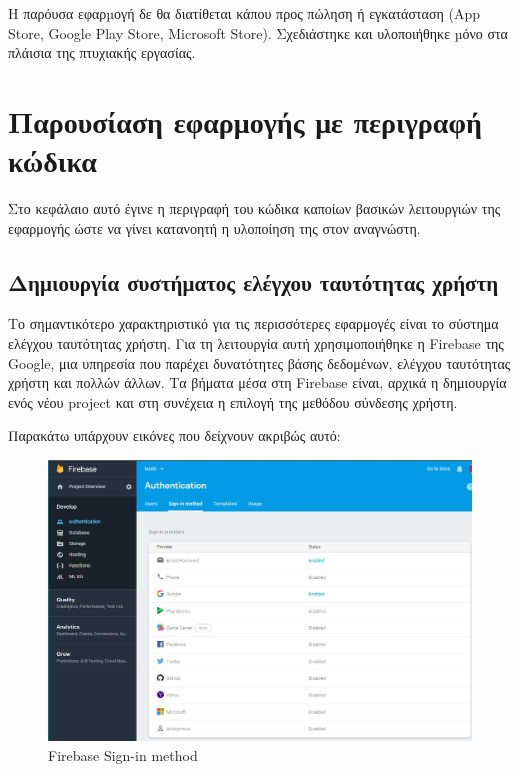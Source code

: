 \documentclass[a4paper,12pt]{article}
\begin{document}
		Η παρόυσα εφαρµογή δε θα διατίθεται κάπου προς πώληση ή εγκατάσταση (App Store, Google Play Store, Microsoft Store).
		Σχεδιάστηκε και υλοποιήθηκε µόνο στα πλάισια της πτυχιακής εργασίας. 
		\newpage
		\section{Παρουσίαση εφαρμογής με περιγραφή κώδικα}
			Στο κεφάλαιο αυτό έγινε η περιγραφή του κώδικα καποίων βασικών λειτουργιών της εφαρμογής ώστε να γίνει κατανοητή η υλοποίηση της στον αναγνώστη.
			\subsection{Δημιουργία συστήματος ελέγχου ταυτότητας χρήστη}

				Το σημαντικότερο χαρακτηριστικό για τις περισσότερες εφαρμογές είναι το σύστημα ελέγχου ταυτότητας χρήστη. Για τη λειτουργία αυτή χρησιμοποιήθηκε 
				η Firebase της Google, μια υπηρεσία που παρέχει δυνατότητες βάσης δεδομένων, ελέγχου ταυτότητας χρήστη και πολλών άλλων. 
				Τα βήματα μέσα στη Firebase είναι, αρχικά η δημιουργία ενός νέου project και στη συνέχεια η επιλογή της μεθόδου σύνδεσης χρήστη.
				
				Παρακάτω υπάρχουν εικόνες που δείχνουν ακριβώς αυτό:

				\vspace*{1cm}

			\begin{figure}[!htb]
				\begin{center}
					\caption{Firebase Sign-in method}
					\vspace*{0.5cm}

					\includegraphics[width=0.9\linewidth]{auth} 
				\end{center}
			\end{figure}
\end{document}
